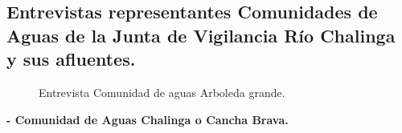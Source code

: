 \documentclass[]{article}
\begin{document}
\subsection{Entrevistas representantes Comunidades de Aguas de la Junta de Vigilancia Río Chalinga y sus afluentes.} \label{Entrevista CA's}

\begin{figure} [H]
	\caption{Entrevista Comunidad de aguas Arboleda grande.}
\end{figure}
\clearpage

\textbf{- Comunidad de Aguas Chalinga o Cancha Brava.}
\end{document}
